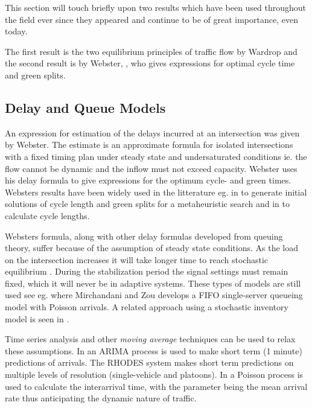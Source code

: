 \label{history}
This section will touch briefly upon two results which have been used throughout the field ever since they appeared and continue to be of great importance, even today. 

The first result is the two equilibrium principles of traffic flow by Wardrop \cite{Wardrop} and the second result is by Webster, \cite{Webster}, who gives expressions for optimal cycle time and green splits.

\subsection{Delay and Queue Models}
\label{webster}
An expression for estimation of the delays incurred at an intersection was given by Webster. The estimate is an approximate formula for isolated intersections with a fixed timing plan under steady state and undersaturated conditions ie. the flow cannot be dynamic and the inflow must not exceed capacity. 
Webster uses his delay formula to give expressions for the optimum cycle- and green times. 
Websters results have been widely used in the litterature eg. in \cite{1} to generate initial solutions of cycle length and green splits for a metaheuristic search and in \cite{30} to calculate cycle lengths.

Websters formula, along with other delay formulas developed from queuing theory, suffer because of the assumption of steady state conditions. As the load on the intersection increases it will take longer time to reach stochastic equilibrium \cite{traffictheory}. During the stabilization period the signal settings must remain fixed, which it will never be in adaptive systems. These types of models are still used see eg. \cite{38} where Mirchandani and Zou develops a FIFO single-server queueing model with Poisson arrivals. A related approach using a stochastic inventory model is seen in \cite{10}.

Time series analysis and other \textit{moving average} techniques can be used to relax these assumptions. In \cite{shortpredict} an ARIMA process is used to make short term (1 minute) predictions of arrivals. The RHODES system \cite{44} makes short term predictions on multiple levels of resolution (single-vehicle and platoons). In \cite{1}                                                                                          a Poisson process is used to calculate the interarrival time, with the parameter being the mean arrival rate thus anticipating the dynamic nature of traffic.

